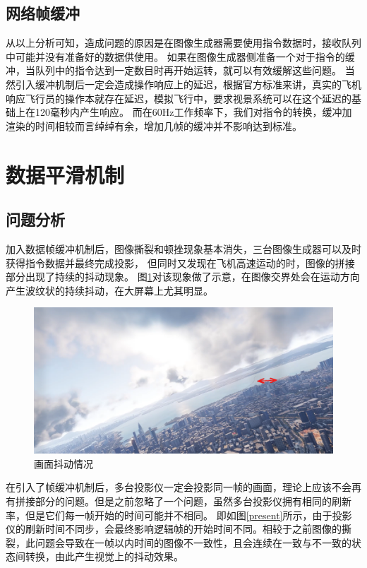 \subsection{网络帧缓冲}
从以上分析可知，造成问题的原因是在图像生成器需要使用指令数据时，接收队列中可能并没有准备好的数据供使用。
如果在图像生成器侧准备一个对于指令的缓冲，当队列中的指令达到一定数目时再开始运转，就可以有效缓解这些问题。
当然引入缓冲机制后一定会造成操作响应上的延迟，根据官方标准来讲，真实的飞机响应飞行员的操作本就存在延迟，模拟飞行中，要求视景系统可以在这个延迟的基础上在120毫秒内产生响应。
而在60Hz工作频率下，我们对指令的转换，缓冲加渲染的时间相较而言绰绰有余，增加几帧的缓冲并不影响达到标准。
\section{数据平滑机制}
\subsection{问题分析}
加入数据帧缓冲机制后，图像撕裂和顿挫现象基本消失，三台图像生成器可以及时获得指令数据并最终完成投影，
但同时又发现在飞机高速运动的时，图像的拼接部分出现了持续的抖动现象。
图\ref{jitter}对该现象做了示意，在图像交界处会在运动方向产生波纹状的持续抖动，在大屏幕上尤其明显。
\begin{figure}[h!]
    \begin{center}
        \includegraphics[width=\textwidth]{pictures/jitter.png}
        \caption{画面抖动情况}
        \label{jitter}
    \end{center}
\end{figure}
\par
在引入了帧缓冲机制后，多台投影仪一定会投影同一帧的画面，理论上应该不会再有拼接部分的问题。但是之前忽略了一个问题，虽然多台投影仪拥有相同的刷新率，但是它们每一帧开始的时间可能并不相同。
即如图\ref{present}所示，由于投影仪的刷新时间不同步，会最终影响逻辑帧的开始时间不同。相较于之前图像的撕裂，此问题会导致在一帧以内时间的图像不一致性，且会连续在一致与不一致的状态间转换，由此产生视觉上的抖动效果。
